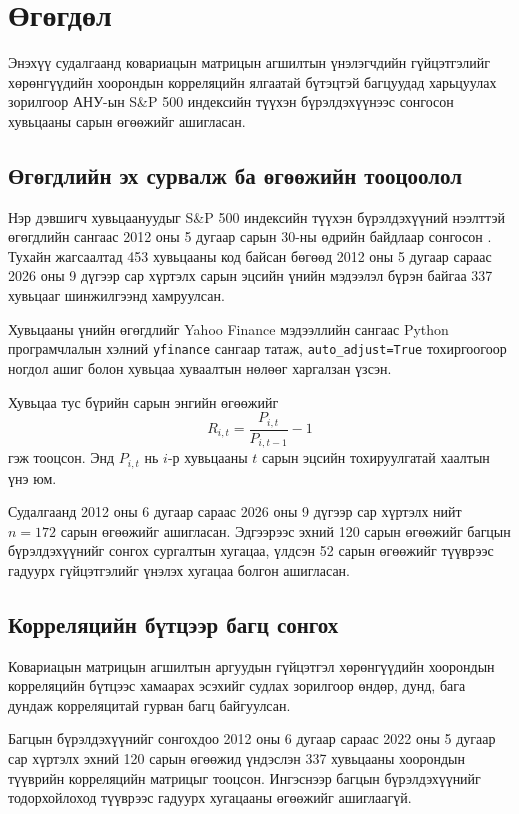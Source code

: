 
\section{Өгөгдөл}
\label{sec:data}

Энэхүү судалгаанд ковариацын матрицын агшилтын
үнэлэгчдийн гүйцэтгэлийг хөрөнгүүдийн хоорондын
корреляцийн ялгаатай бүтэцтэй багцуудад харьцуулах
зорилгоор АНУ-ын S\&P 500 индексийн түүхэн
бүрэлдэхүүнээс сонгосон хувьцааны сарын өгөөжийг
ашигласан.

\subsection{Өгөгдлийн эх сурвалж ба өгөөжийн тооцоолол}

Нэр дэвшигч хувьцаануудыг S\&P 500 индексийн
түүхэн бүрэлдэхүүний нээлттэй өгөгдлийн сангаас
2012 оны 5 дугаар сарын 30-ны өдрийн байдлаар
сонгосон \citep{chinobing_sp500}.
Тухайн жагсаалтад 453 хувьцааны код байсан бөгөөд
2012 оны 5 дугаар сараас 2026 оны 9 дүгээр сар
хүртэлх сарын эцсийн үнийн мэдээлэл бүрэн байгаа
337 хувьцааг шинжилгээнд хамруулсан.

Хувьцааны үнийн өгөгдлийг Yahoo Finance мэдээллийн
сангаас Python програмчлалын хэлний
\texttt{yfinance} сангаар татаж,
\texttt{auto\_adjust=True} тохиргоогоор
ногдол ашиг болон хувьцаа хуваалтын нөлөөг
харгалзан үзсэн.

Хувьцаа тус бүрийн сарын энгийн өгөөжийг
\[
R_{i,t}
=
\frac{P_{i,t}}{P_{i,t-1}}-1
\]
гэж тооцсон. Энд $P_{i,t}$ нь $i$-р хувьцааны
$t$ сарын эцсийн тохируулгатай хаалтын үнэ юм.

Судалгаанд 2012 оны 6 дугаар сараас 2026 оны
9 дүгээр сар хүртэлх нийт $n=172$ сарын
өгөөжийг ашигласан. Эдгээрээс эхний 120 сарын
өгөөжийг багцын бүрэлдэхүүнийг сонгох сургалтын
хугацаа, үлдсэн 52 сарын өгөөжийг түүврээс
гадуурх гүйцэтгэлийг үнэлэх хугацаа болгон
ашигласан.

\subsection{Корреляцийн бүтцээр багц сонгох}

Ковариацын матрицын агшилтын аргуудын гүйцэтгэл
хөрөнгүүдийн хоорондын корреляцийн бүтцээс
хамаарах эсэхийг судлах зорилгоор өндөр, дунд,
бага дундаж корреляцитай гурван багц байгуулсан.

Багцын бүрэлдэхүүнийг сонгохдоо 2012 оны
6 дугаар сараас 2022 оны 5 дугаар сар хүртэлх
эхний 120 сарын өгөөжид үндэслэн 337 хувьцааны
хоорондын түүврийн корреляцийн матрицыг тооцсон.
Ингэснээр багцын бүрэлдэхүүнийг тодорхойлоход
түүврээс гадуурх хугацааны өгөөжийг ашиглаагүй.

